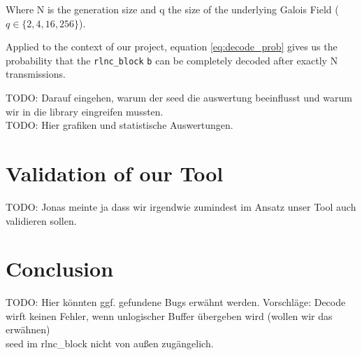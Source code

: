 \documentclass[a4paper,english,10pt]{tumarticle}
\begin{document}
Where N is the generation size and q the size of the underlying Galois Field ($q \in \{2,4,16,256\}$).

Applied to the context of our project, equation \ref{eq:decode_prob} gives us the probability that the 
\texttt{rlnc\_block} \texttt{b} can be completely decoded after exactly N transmissions.

TODO: Darauf eingehen, warum der seed die auswertung beeinflusst und warum wir in die library eingreifen mussten.\\
TODO: Hier grafiken und statistische Auswertungen.


\section{Validation of our Tool}\label{eval}
TODO: Jonas meinte ja dass wir irgendwie zumindest im Ansatz unser Tool auch validieren sollen. 

\section{Conclusion}\label{eval}
TODO: Hier könnten ggf. gefundene Bugs erwähnt werden.
Vorschläge:  Decode wirft keinen Fehler, wenn unlogischer Buffer übergeben wird (wollen wir das erwähnen)\\
seed im rlnc\_block nicht von außen zugängelich.
\end{document}
